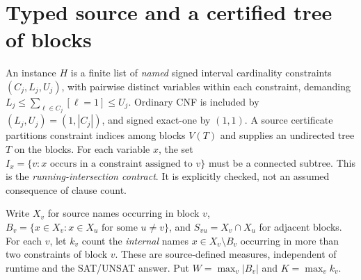 \documentclass[11pt]{article}
\begin{document}
\section{Typed source and a certified tree of blocks}
An instance $H$ is a finite list of \emph{named} signed interval
cardinality constraints $(C_j,L_j,U_j)$, with pairwise distinct variables
within each constraint, demanding
$L_j\le\sum_{\ell\in C_j}[\ell=1]\le U_j$.
Ordinary CNF is included by $(L_j,U_j)=(1,|C_j|)$, and signed exact-one
by $(1,1)$. A source certificate partitions constraint indices among
blocks $V(T)$ and supplies an undirected tree $T$ on the blocks.
For each variable $x$, the set
$I_x=\{v:x\text{ occurs in a constraint assigned to }v\}$ must
be a connected subtree. This is the \emph{running-intersection contract}.
It is explicitly checked, not an assumed consequence of clause count.

Write $X_v$ for source names occurring in block $v$,
$B_v=\{x\in X_v:x\in X_u\text{ for some }u\ne v\}$,
and $S_{vu}=X_v\cap X_u$ for adjacent blocks.
For each $v$, let $k_v$ count the \emph{internal} names
$x\in X_v\setminus B_v$ occurring in more than two constraints of block
$v$. These are source-defined measures, independent of runtime and the
SAT/UNSAT answer. Put $W=\max_v|B_v|$ and $K=\max_vk_v$.
\end{document}
